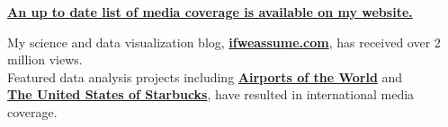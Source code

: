 \documentclass{article}
\begin{document}
\begin{llist}
{\bf {\large \href{https://jradavenport.github.io/media/}{\color{NavyBlue} An up to date list of media coverage is available on my website.}}}

%
%

My science and data visualization blog, \href{http://www.ifweassume.com}{\color{NavyBlue}\bf{ifweassume.com}}, has received %
over 2 million views. \\
Featured data analysis projects including \href{http://www.ifweassume.blogspot.com/2013/06/airports-of-world.html}{\color{NavyBlue}\bf{Airports of the World}} and \\ \href{http://www.ifweassume.blogspot.com/2012/10/the-united-states-of-starbucks.html}{\color{NavyBlue}\bf{The United States of Starbucks}}, have resulted in international media coverage.


\setlength{\topmargin}{-0.35in}


\end{llist}
\end{document}
